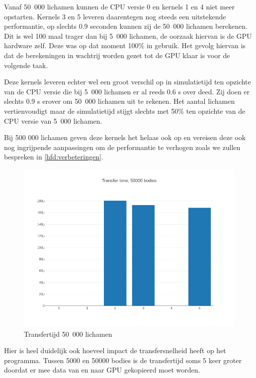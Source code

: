 \documentclass{article}
\begin{document}
Vanaf 50~000 lichamen kunnen de CPU versie 0 en kernels 1 en 4 niet meer opstarten.
Kernels 3 en 5 leveren daarentegen nog steeds een uitstekende performantie, op
slechts 0.9 seconden kunnen zij de 50~000 lichamen berekenen. Dit is wel 100 maal
trager dan bij 5~000 lichamen, de oorzaak hiervan is de GPU hardware zelf. Deze was
op dat moment 100\% in gebruik. Het gevolg hiervan is dat de berekeningen in wachtrij
worden gezet tot de GPU klaar is voor de volgende taak.

Deze kernels leveren echter wel een groot verschil op in simulatietijd ten opzichte van de CPU versie
die bij 5~000 lichamen er al reeds 0.6 s over deed. Zij doen er slechts 0.9 s erover om
50~000 lichamen uit te rekenen. Het aantal lichamen vertienvoudigt maar de
simulatietijd stijgt slechts met 50\% ten opzichte van de CPU versie van 5~000 lichamen.

Bij 500 000 lichamen geven deze kernels het helaas ook op en vereisen deze ook nog
ingrijpende aanpassingen om de performantie te verhogen zoals we zullen bespreken in \ref{hfd:verbeteringen}.

\begin{figure}[H]
    \includegraphics[width=\linewidth]{./grafiekskes/hist_transfer50000.png}
    \caption{Transfertijd 50~000 lichamen}
\end{figure}

Hier is heel duidelijk ook hoeveel impact de transfersnelheid heeft op het programma.
Tussen 5000 en 50000 bodies is de transfertijd soms 5 keer groter doordat er mee data
van en naar GPU gekopieerd moet worden.

\end{document}
